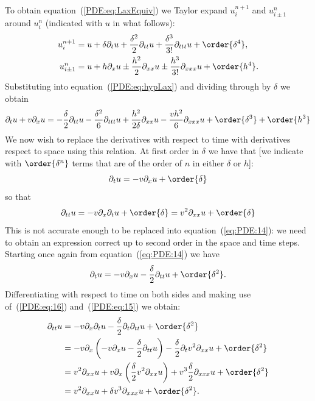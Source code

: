 To obtain equation~(\ref{PDE:eq:LaxEquiv}) we Taylor expand
$u_{i}^{n+1}$ and $u_{i\pm 1}^{n}$ around $u_{i}^{n}$ (indicated with
$u$ in what follows):
%
\begin{align*}
 u_{i}^{n+1} &= u + \delta \partial_t u +
                 \frac{\delta^2}{2}\partial_{t t} u +
                 \frac{\delta^3}{3!} \partial_{t t t} u + \order{\delta^4}, \\
 u_{i\pm 1}^{n} &= u + h \partial_x u \pm
                 \frac{h^2}{2}\partial_{x x} u \pm
                 \frac{h^3}{3!} \partial_{x x x} u + \order{h^4} .
\end{align*}
%
Substituting into equation~(\ref{PDE:eq:hypLax}) and dividing through
by $\delta$ we obtain
%
\begin{equation}
  \partial_t u + v \partial_x u =
  -\frac{\delta}{2} \partial_{t t} u
  -\frac{\delta^2}{6} \partial_{t t t} u
  + \frac{h^2}{2 \delta} \partial_{x x} u
  - \frac{v h^2}{6} \partial_{x x x}u + \order{\delta^3} + \order{h^3}
  \label{eq:PDE:14}
\end{equation}
%
We now wish to replace the derivatives with respect to time with
derivatives respect to space using this relation.  At first order in
$\delta$ we have that [we indicate with $\order{\delta^n}$ terms that are
of the order of $n$ in either $\delta$ or $h$]:
%
\begin{equation}
  \partial_t u = - v \partial_x u + \order{\delta}  \label{PDE:eq:16}
\end{equation}
%
so that
%
\begin{equation}
  \partial_{t t} u = - v \partial_x \partial_t u + \order{\delta} =
  v^2 \partial_{x x} u + \order{\delta}
  \label{PDE:eq:15}
\end{equation}
%
This is not accurate enough to be replaced into
equation~(\ref{eq:PDE:14}): we need to obtain an expression correct up
to second order in the space and time steps.  Starting once again from
equation~(\ref{eq:PDE:14}) we have
%
\begin{equation*}
  \partial_t u = -v \partial_x u
  - \frac{\delta}{2} \partial_{t t} u + \order{\delta^2} .
\end{equation*}
%
Differentiating with respect to time on both sides and making use
of~(\ref{PDE:eq:16}) and~(\ref{PDE:eq:15}) we obtain:
%
\begin{align*}
 \partial_{t t} u &=  -v \partial_x \partial_t u
   - \frac{\delta}{2} \partial_t \partial_{t t} u + \order{\delta^2} \\
  &=  -v \partial_x \left ( -v \partial_x u
   - \frac{\delta}{2} \partial_{t t} u \right )
   - \frac{\delta}{2} \partial_t v^2 \partial_{x x} u + \order{\delta^2} \\
  &=  v^2 \partial_{x x} u + v \partial_x
        \left ( \frac{\delta}{2} v^2 \partial_{x x} u \right ) +
      v^3 \frac{\delta}{2} \partial_{x x x} u + \order{\delta^2} \\
  &=  v^2 \partial_{x x} u + \delta v^3 \partial_{x x x} u +
      \order{\delta^2}.
\end{align*}
